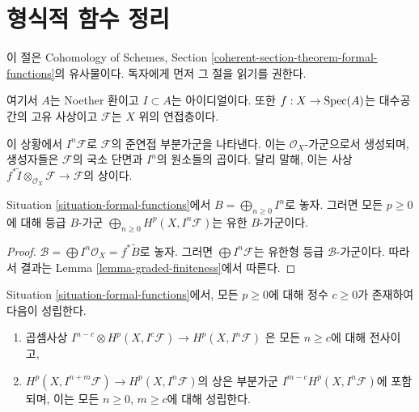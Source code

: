 \section{형식적 함수 정리}
\label{section-theorem-formal-functions}

\noindent
이 절은 Cohomology of Schemes, Section
\ref{coherent-section-theorem-formal-functions}의 유사물이다. 독자에게
먼저 그 절을 읽기를 권한다.

\begin{situation}
\label{situation-formal-functions}
여기서 $A$는 Noether 환이고 $I \subset A$는 아이디얼이다. 또한
$f : X \to \mathop{\mathrm{Spec}}(A)$는 대수공간의 고유 사상이고 $\mathcal{F}$는
$X$ 위의 연접층이다.
\end{situation}

\noindent
이 상황에서
$I^n\mathcal{F}$로 $\mathcal{F}$의 준연접 부분가군을 나타낸다. 이는
$\mathcal{O}_X$-가군으로서 생성되며, 생성자들은 $\mathcal{F}$의
국소 단면과 $I^n$의 원소들의 곱이다. 달리 말해, 이는
사상 $f^*\widetilde{I} \otimes_{\mathcal{O}_X} \mathcal{F} \to
\mathcal{F}$의 상이다.

\begin{lemma}
\label{lemma-cohomology-powers-ideal-times-F}
Situation \ref{situation-formal-functions}에서
$B = \bigoplus_{n \geq 0} I^n$로 놓자. 그러면 모든 $p \geq 0$에 대해
등급 $B$-가군
$\bigoplus_{n \geq 0} H^p(X, I^n\mathcal{F})$는 유한 $B$-가군이다.
\end{lemma}

\begin{proof}
$\mathcal{B} = \bigoplus I^n\mathcal{O}_X = f^*\widetilde{B}$로 놓자.
그러면 $\bigoplus I^n\mathcal{F}$는 유한형 등급
$\mathcal{B}$-가군이다. 따라서 결과는 Lemma
\ref{lemma-graded-finiteness}에서 따른다.
\end{proof}

\begin{lemma}
\label{lemma-cohomology-powers-ideal-application}
Situation \ref{situation-formal-functions}에서, 모든 $p \geq 0$에 대해
정수 $c \geq 0$가 존재하여 다음이 성립한다.
\begin{enumerate}
\item 곱셈사상
$I^{n - c} \otimes H^p(X, I^c\mathcal{F}) \to H^p(X, I^n\mathcal{F})$
은 모든 $n \geq c$에 대해 전사이고,
\item $H^p(X, I^{n + m}\mathcal{F}) \to H^p(X, I^n\mathcal{F})$의 상은
부분가군 $I^{m - c} H^p(X, I^n\mathcal{F})$에 포함되며, 이는 모든
$n \geq 0$, $m \geq c$에 대해 성립한다.
\end{enumerate}
\end{lemma}


